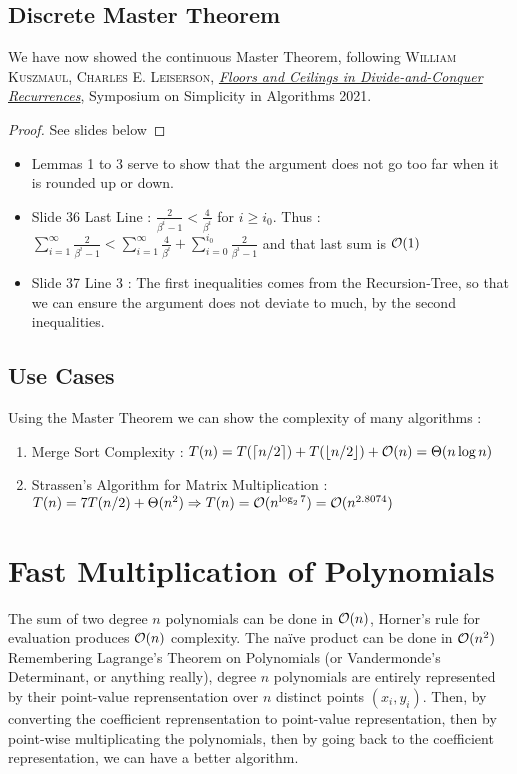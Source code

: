 \documentclass{cours}
\begin{document}
\subsection{Discrete Master Theorem}
We have now showed the continuous Master Theorem, following \textsc{William Kuszmaul, Charles E. Leiserson}, \href{https://epubs.siam.org/doi/pdf/10.1137/1.9781611976496.15}{\textit{Floors and Ceilings in Divide-and-Conquer Recurrences}}, Symposium on Simplicity in Algorithms 2021.\\
\begin{proof}
    See slides below
    
\end{proof}
\begin{remark}
    \begin{itemize}
        \item Lemmas 1 to 3 serve to show that the argument does not go too far when it is rounded up or down.
        \item Slide 36 Last Line : $\frac{2}{\beta^{i} - 1} < \frac{4}{\beta^{i}}$ for $i \geq i_{0}$. Thus : $\sum_{i = 1}^{\infty} \frac{2}{\beta^{i} - 1} < \sum_{i = 1}^{\infty}\frac{4}{\beta^{i}} + \sum_{i = 0}^{i_0}\frac{2}{\beta^{i} - 1}$ and that last sum is $\mathcal{O}(1)$
        \item Slide 37 Line 3 : The first inequalities comes from the Recursion-Tree, so that we can ensure the argument does not deviate to much, by the second inequalities.
    \end{itemize}
\end{remark}
\subsection{Use Cases}
Using the Master Theorem we can show the complexity of many algorithms :
\begin{enumerate}
    \item Merge Sort Complexity : $T(n) = T(\lceil n/2 \rceil) + T(\lfloor n/2 \rfloor) + \mathcal{O}(n) = \Theta(n\log n)$
    \item Strassen's Algorithm for Matrix Multiplication : $T(n) = 7 T(n/2) + \Theta(n^{2}) \Rightarrow T(n) = \mathcal{O}(n^{\log_{2}7}) = \mathcal{O}(n^{2.8074})$
\end{enumerate}

\section{Fast Multiplication of Polynomials}
The sum of two degree $n$ polynomials can be done in $\mathcal{O}(n)$, Horner's rule for evaluation produces $\mathcal{O}(n)$ complexity. The naïve product can be done in $\mathcal{O}(n^2)$\\
Remembering Lagrange's Theorem on Polynomials (or Vandermonde's Determinant, or anything really), degree $n$ polynomials are entirely represented by their point-value reprensentation over $n$ distinct points $(x_{i}, y_{i})$.
Then, by converting the coefficient reprensentation to point-value representation, then by point-wise multiplicating the polynomials, then by going back to the coefficient representation, we can have a better algorithm.
\end{document}
